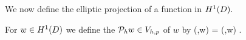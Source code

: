 



We now define the elliptic projection of a function in $\HoD.$%

For $w \in \HoD$ we define the  $\mathcal P_{h} w \in V_{h,p}$ of $w$ by
\beq\label{eq:ellproj}
\api(\vh,\Ph w) = \api(\vh,w) \tfa \vh \in \Vhp.
\eeq
\ede



